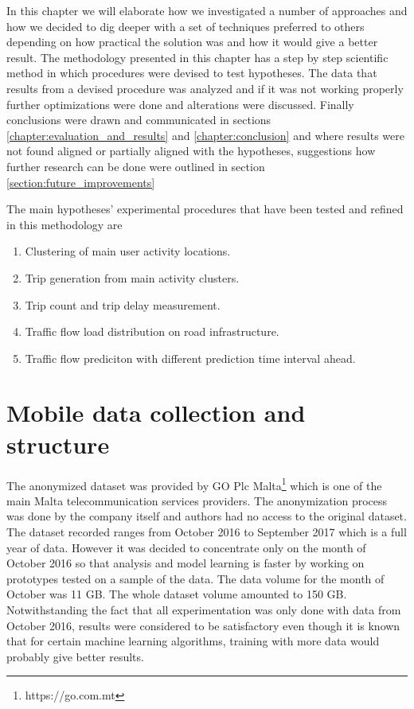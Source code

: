 \documentclass[12pt, a4paper]{report}
\theoremstyle{definition}
\theoremstyle{definition}%
\theoremstyle{definition}%
\theoremstyle{definition}%
\theoremstyle{definition}%
\theoremstyle{definition}%
\begin{document}
In this chapter we will elaborate how we investigated a number of approaches and how we decided to dig deeper with a set of techniques preferred to others depending on how practical the solution was and how it would give a better result. The methodology presented in this chapter has a step by step scientific method in which procedures were devised to test hypotheses. The data that results from a devised procedure was analyzed and if it was not working properly further optimizations were done and alterations were discussed. Finally conclusions were drawn and communicated in sections \ref{chapter:evaluation_and_results} and \ref{chapter:conclusion}  and where results were not found aligned or partially aligned with the hypotheses, suggestions how further research can be done were outlined in section \ref{section:future_improvements} 

The main hypotheses' experimental procedures that have been tested and refined in this methodology are 

\begin{enumerate}
	
	\item Clustering of main user activity locations. 
	\item Trip generation from main activity clusters.
	\item Trip count and trip delay measurement.
	\item Traffic flow load distribution on road infrastructure. 
	\item Traffic flow prediciton with different prediction time interval ahead.
	
\end{enumerate}

\section{Mobile data collection and structure} \label{section:methodology:mobile_data_collection_structure}

The anonymized dataset was provided by GO Plc Malta\footnote{https://go.com.mt} which is one of the main Malta telecommunication services providers. The anonymization process was done by the company itself and authors had no access to the original dataset. The dataset recorded ranges from October 2016 to September 2017 which is a full year of data. However it was decided to concentrate only on the month of October 2016 so that analysis and model learning is faster by working on prototypes tested on a sample of the data. The data volume for the month of October was 11 GB. The whole dataset volume amounted to 150 GB. Notwithstanding the fact that all experimentation was only done with data from October 2016, results were considered to be satisfactory even though it is known that for certain machine learning algorithms, training with more data would probably give better results. 
\end{document}
